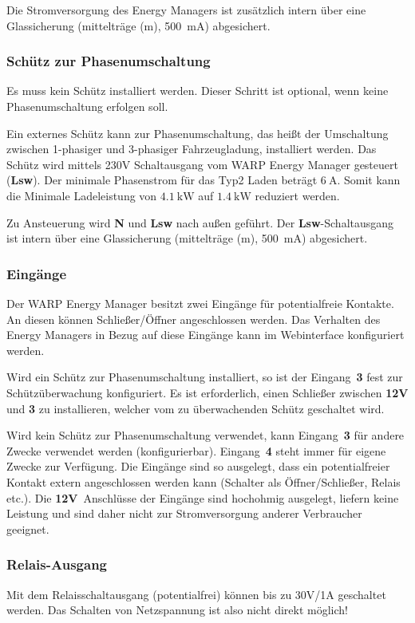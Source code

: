 \documentclass[a4paper,10pt]{article}
\newcommand{\hint}[1]{\begin{tcolorbox}[colback=boxgray,colframe=black,coltext=
white,title=Hinweis,left*=2mm,right*=2mm,boxsep=1mm,bottom=1mm,top=1mm]#1\end{tcolorbox}}
\begin{document}
\begin{multicols*}{2}
	Die Stromversorgung des Energy Managers ist zusätzlich intern über eine Glassicherung 
	(mittelträge (m), \SI{500}{\milli\ampere}) abgesichert.

	\subsubsection{Schütz zur Phasenumschaltung}
	\hint{Es muss kein Schütz installiert werden. Dieser Schritt ist optional,
	wenn keine Phasenumschaltung erfolgen soll.}

	Ein externes Schütz kann zur Phasenumschaltung, das heißt der Umschaltung
	zwischen 1-phasiger und 3-phasiger Fahrzeugladung, installiert werden. Das
	Schütz wird mittels 230V Schaltausgang vom WARP Energy Manager gesteuert
	(\textbf{Lsw}).
	Der minimale Phasenstrom für das Typ2 Laden beträgt $\SI{6}{\ampere}$. Somit
	kann die Minimale Ladeleistung von $\SI{4.1}{\kilo\watt}$ auf
	$\SI{1.4}{\kilo\watt}$ reduziert werden.

	Zu Ansteuerung wird \textbf{N} und \textbf{Lsw} nach außen geführt. Der
	\textbf{Lsw}-Schaltausgang ist intern über eine Glassicherung 
	(mittelträge (m), \SI{500}{\milli\ampere}) abgesichert.


	\subsubsection{Eingänge}
	Der WARP Energy Manager besitzt zwei Eingänge für potentialfreie Kontakte.
	An diesen können Schließer/Öffner angeschlossen werden. Das Verhalten des
	Energy Managers in Bezug auf diese Eingänge kann im Webinterface konfiguriert werden.
	
	Wird ein Schütz zur Phasenumschaltung installiert, so ist der Eingang~\textbf{3} 
	fest zur Schützüberwachung konfiguriert. Es ist erforderlich, einen Schließer zwischen 
	\textbf{12V} und \textbf{3} zu installieren, welcher vom zu überwachenden Schütz geschaltet wird.

	Wird kein Schütz zur Phasenumschaltung verwendet, kann Eingang~\textbf{3} für
	andere Zwecke verwendet werden (konfigurierbar). Eingang~\textbf{4} steht immer
	für eigene Zwecke zur Verfügung. Die Eingänge sind so ausgelegt, dass ein potentialfreier
	Kontakt extern angeschlossen werden kann (Schalter als Öffner/Schließer, Relais etc.).
	Die \textbf{12V}~Anschlüsse der Eingänge sind hochohmig ausgelegt, liefern
	keine Leistung und sind daher nicht zur Stromversorgung anderer Verbraucher
	geeignet.

	\subsubsection{Relais-Ausgang}
	Mit dem Relaisschaltausgang (potentialfrei) können bis zu 30V/1A geschaltet
	werden. Das Schalten von Netzspannung ist also nicht direkt möglich!


\end{multicols*}
\end{document}
